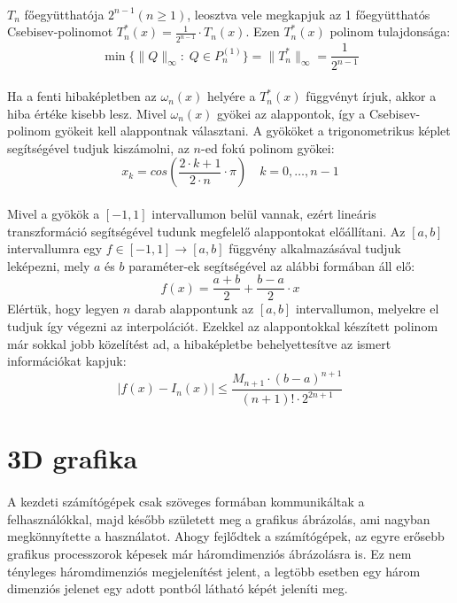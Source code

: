 \documentclass[12pt]{report}
\begin{document}
\paragraph{}
$T_n$ főegyütthatója $2^{n-1} (n \geq 1)$, leosztva vele megkapjuk az 1 főegyütthatós Csebisev-polinomot $T^*_n(x) = \frac{1}{2^{n-1}} \cdot T_n(x)$.
Ezen $T^*_n(x)$ polinom tulajdonsága:
$$
\min\{ \|Q\|_\infty : \; Q \in P^{(1)}_n\} = \|T^*_n\|_\infty = \frac{1}{2^{n-1}}
$$
\paragraph{}
Ha a fenti hibaképletben az $\omega_n(x)$ helyére a $T^*_n(x)$ függvényt írjuk, akkor a hiba értéke kisebb lesz. Mivel $\omega_n(x)$ gyökei az alappontok, így a Csebisev-polinom gyökeit kell alappontnak választani. A gyököket a  trigonometrikus képlet segítségével tudjuk kiszámolni, az $n$-ed fokú polinom gyökei:
$$
x_k = cos(\frac{2 \cdot k + 1}{2 \cdot n} \cdot \pi) \quad k = 0, \dots , n-1
$$
\paragraph{}
Mivel a gyökök a $[-1, 1]$ intervallumon belül vannak, ezért lineáris transzformáció segítségével tudunk megfelelő alappontokat előállítani. Az $[a,b]$ intervallumra egy $f \in [-1,1] \rightarrow [a,b]$ függvény alkalmazásával tudjuk leképezni, mely $a$ és $b$ paraméter-ek segítségével az alábbi formában áll elő:
$$
f(x) = \frac{a+b}{2}+\frac{b-a}{2} \cdot x
$$
Elértük, hogy legyen $n$ darab alappontunk az $[a,b]$ intervallumon, melyekre el tudjuk így végezni az interpolációt. Ezekkel az alappontokkal készített polinom már sokkal jobb közelítést ad, a hibaképletbe behelyettesítve az ismert információkat kapjuk:
$$
|f(x)-I_n(x)| \leq \frac{M_{n+1}\cdot(b-a)^{n+1}}{(n+1)! \cdot 2^{2n+1}}
$$
\newpage
\section{3D grafika}
\paragraph{}
A kezdeti számítógépek csak szöveges formában kommunikáltak a felhasználókkal, majd később született meg a grafikus ábrázolás, ami nagyban megkönnyítette a használatot. Ahogy fejlődtek a számítógépek, az egyre erősebb grafikus processzorok képesek már háromdimenziós ábrázolásra is. Ez nem tényleges háromdimenziós megjelenítést jelent, a legtöbb esetben egy három dimenziós jelenet egy adott pontból látható képét jeleníti meg.
\end{document}
